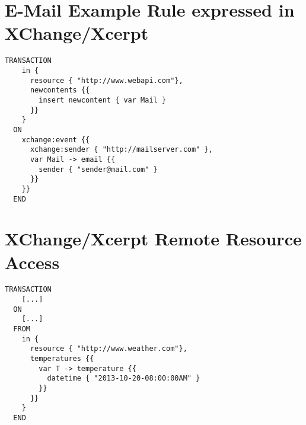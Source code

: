 \section{E-Mail Example Rule expressed in XChange/Xcerpt}
\begin{lstlisting}[nolol,float=h!,label=lstxchange1,language=XChange]
  TRANSACTION
    in {
      resource { "http://www.webapi.com"},
      newcontents {{
        insert newcontent { var Mail }
      }}
    }
  ON
    xchange:event {{
      xchange:sender { "http://mailserver.com" },
      var Mail -> email {{
        sender { "sender@mail.com" }
      }}
    }}
  END
\end{lstlisting}


\section{XChange/Xcerpt Remote Resource Access}
\begin{lstlisting}[nolol,float=h!,label=lstxchange2,language=XChange]
  TRANSACTION
    [...]
  ON
    [...]
  FROM
    in {
      resource { "http://www.weather.com"},
      temperatures {{
        var T -> temperature {{
          datetime { "2013-10-20-08:00:00AM" }
        }}
      }}
    }
  END
\end{lstlisting}


